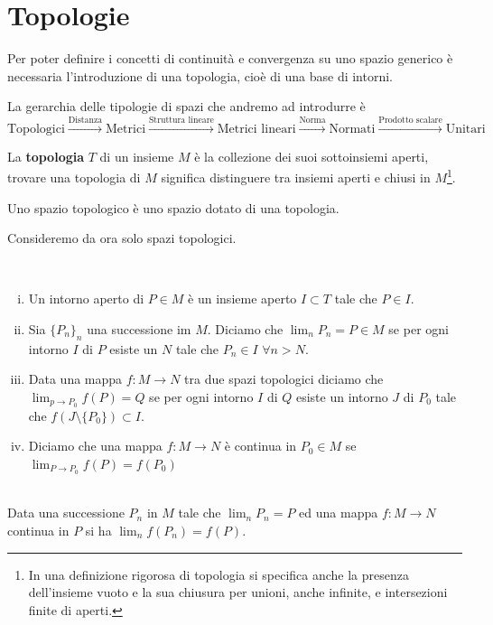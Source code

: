 \documentclass[11pt,a4paper,twoside]{book}
\newenvironment{proposizione}[1][\empty]{\begin{Proposizione}{
\ifx\empty#1\relax\else\mdseries\itshape#1\\\fi
}{}}{\end{Proposizione}}
\newenvironment{definizione}[1][\empty]{\begin{Definizione}{
\ifx\empty#1\relax\else\mdseries\itshape#1\\\fi
}{}}{\end{Definizione}}
\theoremstyle{esss}
\theoremstyle{dotless}
\numberwithin{equation}{section} %
\begin{document}
\section{Topologie}

Per poter definire i concetti di continuità e convergenza su uno spazio generico è necessaria l'introduzione di una topologia, cioè di una base di intorni.

La gerarchia delle tipologie di spazi che andremo ad introdurre è 
\[
\text{Topologici}\overset{\text{Distanza}}{\longrightarrow}\text{Metrici}\overset{\text{Struttura lineare}}{\longrightarrow}\text{Metrici lineari}\overset{\text{Norma}}{\longrightarrow}\text{Normati}
\overset{\text{Prodotto scalare}}{\longrightarrow}\text{Unitari}
\]


La {\bfseries topologia} $T$ di un insieme $M$ è la collezione dei suoi sottoinsiemi aperti, trovare una topologia di $M$ significa distinguere tra insiemi aperti e chiusi in $M$\footnote{In una definizione rigorosa di topologia si specifica anche la presenza dell'insieme vuoto e la sua chiusura per unioni, anche infinite, e intersezioni finite di aperti.}.

Uno spazio topologico è uno spazio dotato di una topologia.

Consideremo da ora solo spazi topologici.

\begin{definizione}
\begin{enumerate}[i.]
\item Un intorno aperto di $P\in M$ è un insieme aperto $I\subset T$ tale che $P\in I$.
\item Sia $\{P_n\}_n$ una successione im $M$. Diciamo che $\lim_n P_n=P\in M$ se per ogni intorno $I$ di $P$ esiste un $N$ tale che $P_n\in I$ $\forall n>N$.
\item Data una mappa $f:M\rightarrow N$ tra due spazi topologici diciamo che $\lim_{p\rightarrow P_0} f(P)=Q$ se per ogni intorno $I$ di $Q$ esiste un intorno $J$ di $P_0$ tale che $f(J\setminus\{P_0\})\subset I$.
\item Diciamo che una mappa $f:M\rightarrow N$ è continua in $P_0\in M$ se $\lim_{P\rightarrow P_0} f(P)=f(P_0)$
\end{enumerate}
\end{definizione}

\begin{proposizione}
Data una successione $P_n$ in $M$ tale che $\lim_n P_n=P$ ed una mappa $f:M\rightarrow N$ continua in $P$ si ha $\lim_n f(P_n)=f(P)$.
\end{proposizione}
\end{document}
